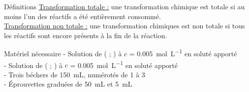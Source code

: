 \documentclass[a4paper,11pt,fleqn]{scrartcl}%
\begin{document}
\vspace{1em}
\noindent
\begin{minipage}[t][3.5cm]{.5\textwidth}
\begin{documentboxenv}{Définitions}
 \underline{Transformation totale :} une transformation chimique est totale si au moins l'un des réactifs a été entièrement consommé.\\
\underline{Transformation non totale :} une transformation chimiques est non totale si tous les réactifs sont encore présents à la fin de la réaction.
\end{documentboxenv}
\end{minipage}
\noindent
\begin{minipage}[t][3.5cm][t]{.45\textwidth}
\begin{documentboxenv}{Matériel nécessaire}
- Solution de ( ; ) à $c$ = \SI{0,005}{\mole \per \liter} en soluté  apporté\\
- Solution de ( ; ) à $c$ = \SI{0,005}{\mole \per \liter} en soluté  apporté\\
- Trois béchers de \SI{150}{\milli \liter}, numérotés de 1 à 3\\
- Éprouvettes graduées de \SI{50}{\milli \liter} et \SI{5}{\milli \liter}
\end{documentboxenv}
\end{minipage}
\end{document}
